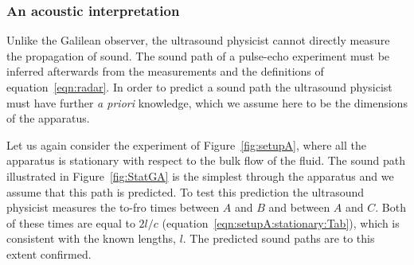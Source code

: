 \documentclass[10pt, fleqn,final,showtrims,oldfontcommands, article,a4paper,oneside]{memoir} %
\newcommand{\figref}[1]{Figure~\ref{fig:#1}}
\newcommand*\her {her\xspace}
\begin{document}
\subsubsection{An acoustic interpretation}\label{sec:MMLorentzian}

Unlike the Galilean observer, the ultrasound physicist cannot directly measure the propagation of sound.
The sound path of a pulse-echo experiment must be inferred afterwards from the measurements and the  definitions of equation~\ref{eqn:radar}.
In order to  predict a  sound path the ultrasound physicist must have further {\em a priori}  knowledge,
which we assume here to be the dimensions  of the apparatus.


Let us again consider the experiment of \figref{setupA},
where all the apparatus is stationary with respect to the bulk flow of the fluid.
The sound path illustrated in  \figref{StatGA} is the simplest through the apparatus and we assume
that this path is predicted.
%
To test this prediction the ultrasound  physicist measures the to-fro times between $A$ and $B$ and between
$A$ and  $C$.
Both of these times  are equal to $2l/c$ (equation~\ref{eqn:setupA:stationary:Tab}),
which is  consistent with the known lengths, $l$.
The predicted sound paths are to this extent confirmed.
\end{document}
